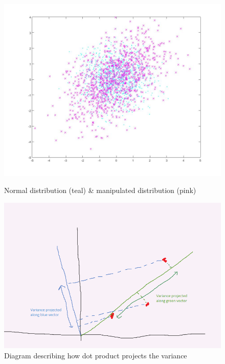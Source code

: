 \documentclass[10pt]{article}
\begin{document}
\begin{figure}[!h]
  \centering
  \begin{minipage}[b]{0.3\textwidth}
      \includegraphics[width=\textwidth]{twoDGaussian.jpg}
      \caption{Normal distribution (teal) \& manipulated distribution (pink)}
  \end{minipage}
  \hfill
  \begin{minipage}[b]{0.3\textwidth}
     \includegraphics[width=\textwidth]{varianceProjection.png}
     \caption{Diagram describing how dot product projects the variance}
  \end{minipage}
  \begin{minipage}[b]{0.3\textwidth}

\end{minipage}
\end{figure}
\end{document}
